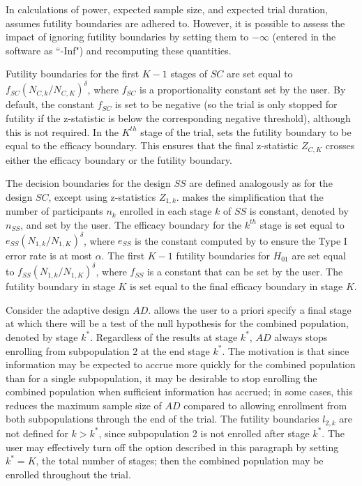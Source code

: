 \documentclass[article]{jss}
\begin{document}
In calculations of power, expected sample size, and expected trial duration,  assumes futility boundaries are adhered to. However, it is possible to assess the impact of ignoring futility boundaries by setting them to $-\infty$ (entered in the software as ``-Inf") and recomputing these quantities.

Futility boundaries for the first $K-1$ stages of $SC$ are set equal to $f_{SC}(N_{C,k}/N_{C,K})^{\delta}$, where $f_{SC}$ is a proportionality constant set by the user. By default, the constant $f_{SC}$ is set to be negative (so the trial  is only stopped for futility  if the z-statistic is below the corresponding negative threshold), although this is not required. In the $K ^{th}$ stage of the trial,  sets the futility boundary to be equal to the efficacy boundary. This ensures that the final z-statistic $Z_{C,K}$ crosses either the efficacy boundary or the futility boundary.

The decision boundaries for the design $SS$  are defined analogously as for the design $SC$, except using z-statistics $Z_{1,k}$.  makes the simplification that the number of participants $n_k$ enrolled in each stage $k$ of $SS$ is constant, denoted by $n_{SS}$, and set by the user.
The efficacy boundary for the $k^{th}$ stage is set equal to $e_{SS}(N_{1,k}/N_{1,K})^{\delta}$, where $e_{SS}$ is the constant computed by    to ensure  the  Type I error rate is at most $\alpha$. The first $K-1$ futility boundaries for $H_{01}$ are set equal to $f_{SS}(N_{1,k}/N_{1,K})^{\delta}$,  where $f_{SS}$ is a constant that can be set by the user. The futility boundary in stage $K$ is set equal to the final efficacy boundary in stage $K$.

Consider the adaptive design $AD$.
 allows the user to a priori specify a final stage  at which there will be a test of  the null hypothesis for the combined population, denoted by stage $k^*$. Regardless of the results at stage $k^*$, $AD$ always stops enrolling from subpopulation $2$ at the end stage $k^*$. The motivation is that since information may be expected to accrue more quickly for the combined population than for a single subpopulation, it may be desirable to stop enrolling the combined population when sufficient information has accrued; in some cases, this reduces the maximum sample size of $AD$ compared to allowing enrollment from both subpopulations through the end of the trial.
The futility boundaries $l_{2,k}$ are not defined for $k>k^*$, since subpopulation 2 is not enrolled after stage $k^*$. 
The user may effectively turn off the option described in this paragraph by setting $k^*=K$, the total number of stages; then the combined population may be enrolled throughout the trial.
\end{document}
